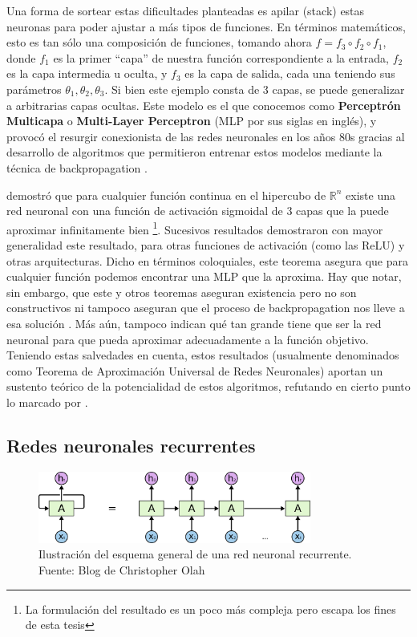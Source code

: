 Una forma de sortear estas dificultades planteadas es apilar (stack) estas neuronas para poder ajustar a más tipos de funciones. En términos matemáticos, esto es tan sólo una composición de funciones, tomando ahora $f = f_3 \circ f_2 \circ f_1$, donde $f_1$ es la primer ``capa'' de nuestra función correspondiente a la entrada, $f_2$ es la capa intermedia u oculta, y $f_3$ es la capa de salida, cada una teniendo sus parámetros $\theta_1, \theta_2, \theta_3$. Si bien este ejemplo consta de 3 capas, se puede generalizar a arbitrarias capas ocultas. Este modelo es el que conocemos como \textbf{Perceptrón Multicapa} o \textbf{Multi-Layer Perceptron} (MLP por sus siglas en inglés), y provocó el resurgir conexionista de las redes neuronales en los años 80s gracias al desarrollo de algoritmos que permitieron entrenar estos modelos mediante la técnica de backpropagation \cite{rumelhart1986learning}.

\citet{cybenko1989approximation} demostró que para cualquier función continua en el hipercubo de $\mathbb{R}^n$ existe una red neuronal con una función de activación sigmoidal de 3 capas que la puede aproximar infinitamente bien \footnote{La formulación del resultado es un poco más compleja pero escapa los fines de esta tesis}. Sucesivos resultados demostraron con mayor generalidad este resultado, para otras funciones de activación (como las ReLU) y otras arquitecturas. Dicho en términos coloquiales, este teorema asegura que para cualquier función podemos encontrar una MLP que la aproxima. Hay que notar, sin embargo, que este y otros teoremas aseguran existencia pero no son constructivos ni tampoco aseguran que el proceso de backpropagation nos lleve a esa solución \cite{goodfellow2016deep}. Más aún, tampoco indican qué tan grande tiene que ser la red neuronal para que pueda aproximar adecuadamente a la función objetivo. Teniendo estas salvedades en cuenta, estos resultados (usualmente denominados como Teorema de Aproximación Universal de Redes Neuronales) aportan un sustento teórico de la potencialidad de estos algoritmos, refutando en cierto punto lo marcado por \citet{minsky1969perceptrons}.

\subsection{Redes neuronales recurrentes}

\begin{figure}
    \centering
    \includegraphics[width=0.8\textwidth]{img/rnn.png}
    \caption{Ilustración del esquema general de una red neuronal recurrente. Fuente: Blog de Christopher Olah}
    \label{fig:recurrent_net}
\end{figure}

